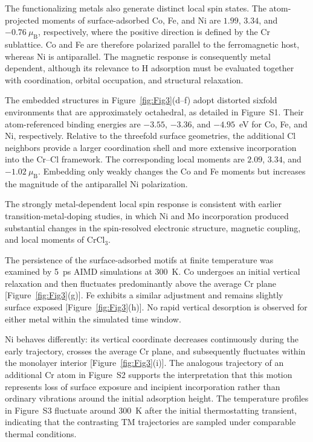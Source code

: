 \documentclass[journal=jacsat,manuscript=article]{achemso}
\begin{document}
The functionalizing metals also generate distinct local spin states. The atom-projected moments of surface-adsorbed Co, Fe, and Ni are $1.99$, $3.34$, and $-0.76~\mu_{\mathrm B}$, respectively, where the positive direction is defined by the Cr sublattice. Co and Fe are therefore polarized parallel to the ferromagnetic host, whereas Ni is antiparallel. The magnetic response is consequently metal dependent, although its relevance to H adsorption must be evaluated together with coordination, orbital occupation, and structural relaxation.

The embedded structures in Figure~\ref{fig:Fig3}(d--f) adopt distorted sixfold environments that are approximately octahedral, as detailed in Figure~S1. Their atom-referenced binding energies are $-3.55$, $-3.36$, and $-4.95$~eV for Co, Fe, and Ni, respectively. Relative to the threefold surface geometries, the additional Cl neighbors provide a larger coordination shell and more extensive incorporation into the Cr--Cl framework. The corresponding local moments are $2.09$, $3.34$, and $-1.02~\mu_{\mathrm B}$. Embedding only weakly changes the Co and Fe moments but increases the magnitude of the antiparallel Ni polarization.

The strongly metal-dependent local spin response is consistent with earlier transition-metal-doping studies, in which Ni and Mo incorporation produced substantial changes in the spin-resolved electronic structure, magnetic coupling, and local moments of CrCl$_3$\cite{Wang2019,Safi2023}.

The persistence of the surface-adsorbed motifs at finite temperature was examined by 5~ps AIMD simulations at 300~K. Co undergoes an initial vertical relaxation and then fluctuates predominantly above the average Cr plane [Figure~\ref{fig:Fig3}(g)]. Fe exhibits a similar adjustment and remains slightly surface exposed [Figure~\ref{fig:Fig3}(h)]. No rapid vertical desorption is observed for either metal within the simulated time window.

Ni behaves differently: its vertical coordinate decreases continuously during the early trajectory, crosses the average Cr plane, and subsequently fluctuates within the monolayer interior [Figure~\ref{fig:Fig3}(i)]. The analogous trajectory of an additional Cr atom in Figure~S2 supports the interpretation that this motion represents loss of surface exposure and incipient incorporation rather than ordinary vibrations around the initial adsorption height. The temperature profiles in Figure~S3 fluctuate around 300~K after the initial thermostatting transient, indicating that the contrasting TM trajectories are sampled under comparable thermal conditions.
\end{document}
